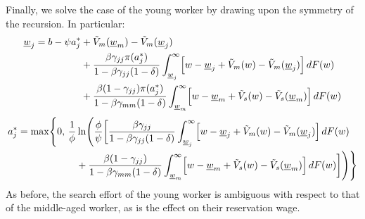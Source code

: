 \documentclass{article}
\newcommand{\lbar}[1]{\underline{#1}} %
\begin{document}
Finally, we solve the case of the young worker by drawing upon the symmetry of the recursion. In particular:
\begin{align*}
\lbar{w}_j
=
b-\psi a_j^*
&+\tilde V_m(\lbar w_m)-\tilde V_m(\lbar w_j)\\
&+\frac{\beta\gamma_{jj}\pi(a_j^*)}
{1-\beta\gamma_{jj}(1-\delta)}
\int_{\lbar{w}_j}^{\infty}
\Bigl[
w-\lbar{w}_j+\tilde V_m(w)-\tilde V_m(\lbar{w}_j)
\Bigr]\,dF(w)\\
&+\frac{\beta(1-\gamma_{jj})\pi(a_j^*)}
{1-\beta\gamma_{mm}(1-\delta)}
\int_{\lbar{w}_m}^{\infty}
\Bigl[
w-\lbar{w}_m+\tilde V_s(w)-\tilde V_s(\lbar{w}_m)
\Bigr]\,dF(w)
\end{align*}
\begin{align*}
a_j^*
=
\max\Biggl\{
0,\,
\frac{1}{\phi}&
\ln\Biggl(
\frac{\phi}{\psi}
\biggl[
\frac{\beta\gamma_{jj}}
{1-\beta\gamma_{jj}(1-\delta)}
\int_{\lbar{w}_j}^{\infty}
\Bigl[
w-\lbar{w}_j+\tilde V_m(w)-\tilde V_m(\lbar{w}_j)
\Bigr]\,dF(w)\\
&+
\frac{\beta(1-\gamma_{jj})}
{1-\beta\gamma_{mm}(1-\delta)}
\int_{\lbar{w}_m}^{\infty}
\Bigl[
w-\lbar{w}_m+\tilde V_s(w)-\tilde V_s(\lbar{w}_m)
\Bigr]\,dF(w)
\biggr]
\Biggr)
\Biggr\}
\end{align*}
As before, the search effort of the young worker is ambiguous with respect to that of the middle-aged worker, as is the effect on their reservation wage.
\medskip
\end{document}
